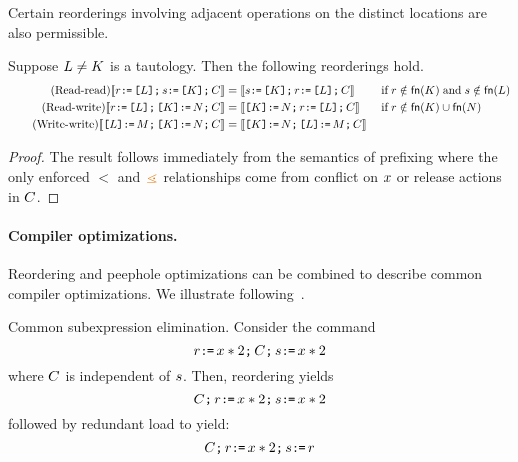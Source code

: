 Certain reorderings involving adjacent operations on the distinct locations
are also permissible. 

\begin{lemma}%
  Suppose $L\neq K$ is a tautology.  Then the following reorderings hold.
  \begin{align*}
    \tag{Read-read}
    \llbracket r \texttt{:}\mkern-1mu\texttt{=}\, \texttt{[}L\texttt{]} \texttt{;}\, s \texttt{:}\mkern-1mu\texttt{=}\, \texttt{[}K\texttt{]} \texttt{;}\, C\rrbracket &=
    \llbracket s \texttt{:}\mkern-1mu\texttt{=}\, \texttt{[}K\texttt{]} \texttt{;}\, r \texttt{:}\mkern-1mu\texttt{=}\, \texttt{[}L\texttt{]} \texttt{;}\, C\rrbracket
    &&\;\allowbreak\text{if}\allowbreak\; r\notin\mathsf{fn}(K) \;\allowbreak\text{and}\allowbreak\; s\notin\mathsf{fn}(L)
    \\
    \tag{Read-write}
    \llbracket r \texttt{:}\mkern-1mu\texttt{=}\, \texttt{[}L\texttt{]} \texttt{;}\, \texttt{[}K\texttt{]} \texttt{:}\mkern-1mu\texttt{=}\, N \texttt{;}\, C\rrbracket &=
    \llbracket\texttt{[}K\texttt{]} \texttt{:}\mkern-1mu\texttt{=}\, N \texttt{;}\, r \texttt{:}\mkern-1mu\texttt{=}\, \texttt{[}L\texttt{]} \texttt{;}\, C\rrbracket
    &&\;\allowbreak\text{if}\allowbreak\; r\notin\mathsf{fn}(K) \cup\mathsf{fn}(N)
    \\
    \tag{Write-write}
    \llbracket\texttt{[}L\texttt{]} \texttt{:}\mkern-1mu\texttt{=}\, M \texttt{;}\, \texttt{[}K\texttt{]} \texttt{:}\mkern-1mu\texttt{=}\, N \texttt{;}\, C\rrbracket &=
    \llbracket\texttt{[}K\texttt{]} \texttt{:}\mkern-1mu\texttt{=}\, N \texttt{;}\, \texttt{[}L\texttt{]} \texttt{:}\mkern-1mu\texttt{=}\, M \texttt{;}\, C\rrbracket
  \end{align*}

\begin{proof}
  The result follows immediately from the semantics of prefixing where the
  only enforced $\lt$ and $\gtN$ relationships come from conflict on $x$ or
  release actions in $C$.
\end{proof}
\end{lemma}

\paragraph*{Compiler optimizations.} Reordering and peephole optimizations can be combined to describe common  compiler optimizations.  We illustrate following~\citet{Dolan:2018:BDR:3192366.3192421}.

Common subexpression elimination. Consider the command 
\[ r \texttt{:}\mkern-1mu\texttt{=}\, x *2  \texttt{;}\, C \texttt{;}\, s \texttt{:}\mkern-1mu\texttt{=}\, x * 2 \]
where $C$ is independent of $s$.  Then, reordering yields
\[C \texttt{;}\, r \texttt{:}\mkern-1mu\texttt{=}\, x *2  \texttt{;}\,  s \texttt{:}\mkern-1mu\texttt{=}\, x * 2 \]
followed by redundant load to yield:
\[C \texttt{;}\, r \texttt{:}\mkern-1mu\texttt{=}\, x * 2 \texttt{;}\,  s \texttt{:}\mkern-1mu\texttt{=}\, r\]

